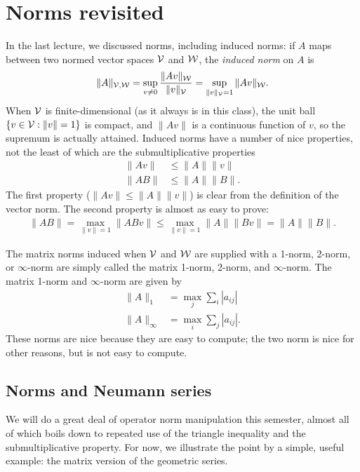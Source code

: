 \documentclass[12pt, leqno]{article}
\begin{document}

\section{Norms revisited}

In the last lecture, we discussed norms, including induced norms:
if $A$ maps between two normed vector spaces $\mathcal{V}$ and $\mathcal{W}$,
the {\em induced norm} on $A$ is
\[
  \|A\|_{\mathcal{V},\mathcal{W}}
  = \sup_{v \neq 0} \frac{ \|Av\|_{\mathcal{W}} }{ \|v\|_{\mathcal{V}} }
  = \sup_{\|v\|_{\mathcal{V}} = 1} \|Av\|_{\mathcal{W}}.
\]
When $\mathcal{V}$ is finite-dimensional (as it always is in this class),
the unit ball $\{v \in \mathcal{V} : \|v\| = 1\}$ is compact, and $\|Av\|$
is a continuous function of $v$, so the supremum is actually attained.
Induced norms have a number of nice properties, not the least of
which are the submultiplicative properties
\begin{align*}
  \|Av\| & \leq \|A\| \|v\| \\
  \|AB\| & \leq \|A\| \|B\|.
\end{align*}
The first property ($\|Av\| \leq \|A\| \|v\|$) is clear from the
definition of the vector norm.  The second property is almost as easy
to prove:
\begin{align*}
  \|AB\| =    \max_{\|v\| = 1} \|ABv\|
         \leq \max_{\|v\| = 1} \|A\| \|Bv\|
         = \|A\| \|B\|.
\end{align*}

The matrix norms induced when $\mathcal{V}$ and $\mathcal{W}$ are supplied with a 1-norm,
2-norm, or $\infty$-norm are simply called the matrix 1-norm, 2-norm,
and $\infty$-norm.  The matrix 1-norm and $\infty$-norm are given by
\begin{align*}
  \|A\|_1       &= \max_{j} \sum_{i} |a_{ij}| \\
  \|A\|_{\infty} &= \max_{i} \sum_{j} |a_{ij}|.
\end{align*}
These norms are nice because they are easy to compute; the two norm
is nice for other reasons, but is not easy to compute.

\subsection{Norms and Neumann series}

We will do a great deal of operator norm manipulation this semester,
almost all of which boils down to repeated use of the triangle
inequality and the submultiplicative property.  For now, we illustrate
the point by a simple, useful example: the matrix version of
the geometric series.
\end{document}
